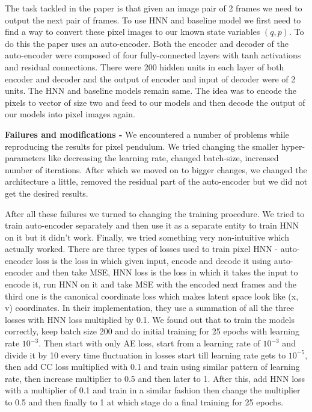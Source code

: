 The task tackled in the paper is that given an image pair of 2 frames we need to output the next pair of frames. To use HNN and baseline model we first need to find a way to convert these pixel images to our known state variables \((q, p)\). To do this the paper uses an auto-encoder. Both the encoder and decoder of the auto-encoder were composed of four fully-connected layers with tanh activations and residual connections. There were 200 hidden units in each layer of both encoder and decoder and the output of encoder and input of decoder were of 2 units. The HNN and baseline models remain same. The idea was to encode the pixels to vector of size two and feed to our models and then decode the output of our models into pixel images again.

\textbf{Failures and modifications -} We encountered a number of problems while reproducing the results for pixel pendulum. We tried changing the smaller hyper-parameters like decreasing the learning rate, changed batch-size, increased number of iterations. After which we moved on to bigger changes, we changed the architecture a little, removed the residual part of the auto-encoder but we did not get the desired results.

After all these failures we turned to changing the training procedure. We tried to train auto-encoder separately and then use it as a separate entity to train HNN on it but it didn't work. Finally, we tried something very non-intuitive which actually worked. There are three types of losses used to train pixel HNN - auto-encoder loss is the loss in which given input, encode and decode it using auto-encoder and then take MSE, HNN loss is the loss in which it takes the input to encode it, run HNN on it and take MSE with the encoded next frames and the third one is the canonical coordinate loss which makes latent space look like (x, v) coordinates. In their implementation, they use a summation of all the three losses with HNN loss multiplied by 0.1. We found out that to train the models correctly, keep batch size 200 and do initial training for 25 epochs with learning rate \(10^{-3}\). Then start with only AE loss, start from a learning rate of \(10^{-3}\) and divide it by 10 every time fluctuation in losses start till learning rate gets to \(10^{-5}\), then add CC loss multiplied with 0.1 and train using similar pattern of learning rate, then increase multiplier to 0.5 and then later to 1. After this, add HNN loss with a multiplier of 0.1 and train in a similar fashion then change the multiplier to 0.5 and then finally to 1 at which stage do a final training for 25 epochs.

